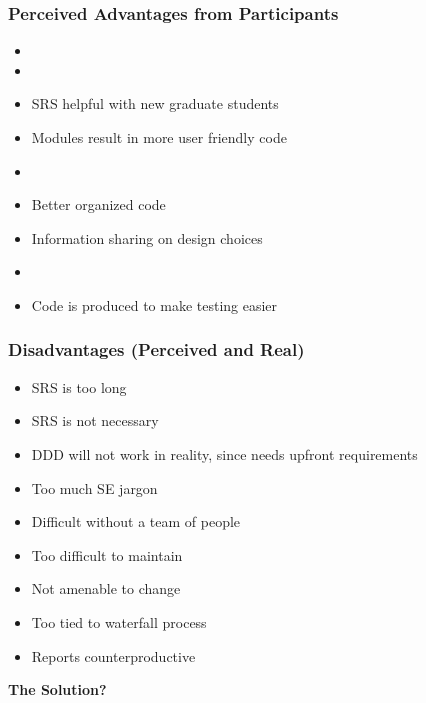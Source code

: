 \documentclass[t,12pt,numbers,fleqn]{beamer}
\begin{document}
\begin{frame}

\frametitle{Perceived Advantages from Participants}

\begin{itemize}
\item {}
\item {}
\item SRS helpful with new graduate students
\item Modules result in more user friendly code
\item {}
\item Better organized code
\item Information sharing on design choices
\item {}
\item Code is produced to make testing easier
\end{itemize}

\end{frame}




\begin{frame}

\frametitle{Disadvantages (Perceived and Real)}

\begin{itemize}
\item SRS is too long
\item SRS is not necessary
\item DDD will not work in reality, since needs upfront requirements
\item Too much SE jargon
\item Difficult without a team of people
\item Too difficult to maintain
\item Not amenable to change
\item Too tied to waterfall process
\item Reports counterproductive \cite{Roache1998}
\end{itemize}

\textbf{The Solution?}

\end{frame}
\end{document}
